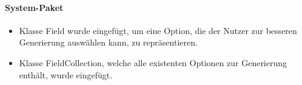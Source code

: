 \paragraph{System-Paket}
\begin{itemize}
\item Klasse Field wurde eingefügt, um eine Option, die der Nutzer zur besseren Generierung auswählen kann, zu repräsentieren.
\item Klasse FieldCollection, welche alle existenten Optionen zur Generierung enthält, wurde eingefügt.
\end{itemize}